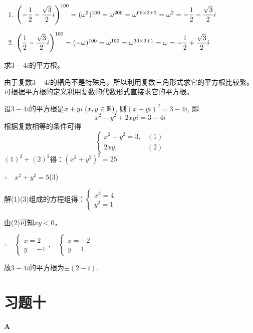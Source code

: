 \begin{solution}
\begin{enumerate}[(1)]
    \item $\left(-\dfrac{1}{2}-\dfrac{\sqrt{3}}{2}i\right)^{100}=(\omega^2)^{100}=\omega^{200}=\omega^{66\times 3+2}=\omega^2=-\dfrac{1}{2}-\dfrac{\sqrt{3}}{2}i$
    \item $\left(\dfrac{1}{2}-\dfrac{\sqrt{3}}{2}i\right)^{100}=(-\omega)^{100}=\omega^{100}=\omega^{33\times 3+1}=\omega=-\dfrac{1}{2}+\dfrac{\sqrt{3}}{2}i$
\end{enumerate}
\end{solution}

\begin{example}
    求$3-4i$的平方根。
\end{example}

\begin{analyze}
    由于复数$3-4i$的辐角不是特殊角，所以利用复数三角形式求它的平方根比较繁。可根据平方根的定义利用复数的代数形式直接求它的平方根。
\end{analyze}
    
\begin{solution}
设$3-4i$的平方根是$x+yi\; (x,y\in\mathbb{R})$, 
    则$(x+yi)^2=3-4i$,
    即\[x^2-y^2+2xyi=3-4i\]
    根据复数相等的条件可得
\[\begin{cases}
    x^2+y^2=3, & (1)\\
    2xy,& (2)
\end{cases}\]
$(1)^2+(2)^2$得：$(x^2+y^2)^2=25$

$\therefore\quad x^2+y^2=5$\hfill(3)

解(1)(3)组成的方程组得：$\begin{cases}
    x^2=4\\ y^2=1
\end{cases}$

由(2)可知$xy<0$，

$\therefore\quad \begin{cases}
    x=2\\y=-1
\end{cases},\quad \begin{cases}
    x=-2\\y=1
\end{cases}$

故$3-4i$的平方根为$\pm(2-i)$.
\end{solution}

\section*{习题十}
\begin{center}
\bfseries A
\end{center}

